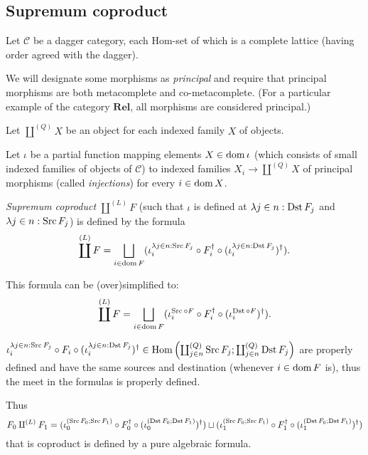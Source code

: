 \subsection{Supremum coproduct}

Let $\mathcal{C}$ be a dagger category, each Hom-set of which is a complete
lattice (having order agreed with the dagger).

We will designate some morphisms as \emph{principal} and require that
principal morphisms are both metacomplete and co-metacomplete. (For a
particular example of the category $\mathbf{Rel}$, all morphisms are
considered principal.)

Let $\coprod^{(Q)} X$ be an object for each indexed family $X$ of objects.

Let $\iota$ be a partial function mapping elements $X \in \operatorname{dom} \iota$
(which consists of small indexed families of objects of $\mathcal{C}$) to
indexed families $X_i \rightarrow \coprod^{(Q)} X$ of principal morphisms
(called \emph{injections}) for every $i \in \operatorname{dom} X$.

\begin{defn}
  \emph{Supremum coproduct} $\coprod^{(L)} F$ (such that $\iota$ is defined
  at $\lambda j \in n : \operatorname{Dst} F_j$ and $\lambda j \in n : \operatorname{Src}
  F_j$) is defined by the formula
  \[ \coprod^{(L)} F = \bigsqcup_{i \in \dom F} (\iota^{\lambda j \in n
     : \Src F_j}_i \circ F_i^{\dagger} \circ (\iota^{\lambda j \in n :
     \Dst F_j}_i)^{\dagger}) . \]
\end{defn}

This formula can be (over)simplified to:
\[ \coprod^{(L)} F = \bigsqcup_{i \in \dom F} (\iota^{\Src \circ
   F}_i \circ F_i^{\dagger} \circ (\iota^{\Dst \circ F}_i)^{\dagger}) .
\]

\begin{rem}
  $\iota^{\lambda j \in n : \operatorname{Src} F_j}_i \circ F_i \circ (\iota^{\lambda
  j \in n : \operatorname{Dst} F_j}_i)^{\dagger} \in \operatorname{Hom} \left(
  \coprod^{(Q)}_{j \in n} \operatorname{Src} F_j ; \coprod^{(Q)}_{j \in n} \operatorname{Dst}
  F_j \right)$ are properly defined and have the same sources and destination
  (whenever $i \in \operatorname{dom} F$ is), thus the meet in the formulas is
  properly defined.
\end{rem}

\begin{rem}
  Thus
  \[ F_0 \amalg^{(L)} F_1 = (\iota^{(\operatorname{Src} F_0 ; \operatorname{Src} F_1)}_0 \circ
     F_0^{\dagger} \circ (\iota^{(\operatorname{Dst} F_0 ; \operatorname{Dst}
     F_1)}_0)^{\dagger}) \sqcup (\iota^{(\operatorname{Src} F_0 ; \operatorname{Src} F_1)}_1
     \circ F_1^{\dagger} \circ (\iota^{(\operatorname{Dst} F_0 ; \operatorname{Dst}
     F_1)}_1)^{\dagger}) \]
  that is coproduct is defined by a pure algebraic formula.
\end{rem}

